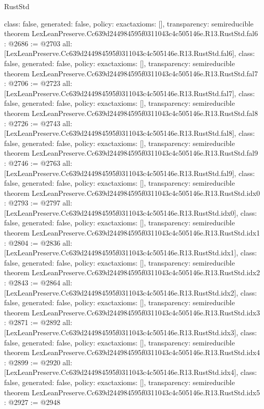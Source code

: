 \begin{lexlean}{RustStd}
\begin{coremodule}
{  class: false,
  generated: false,
  policy: exact{axioms: []},
  transparency: semireducible
}
theorem LexLeanPreserve.Cc639d244984595f0311043c4c505146e.R13.RustStd.fal6 : @2686 := @2703 {
  all: [LexLeanPreserve.Cc639d244984595f0311043c4c505146e.R13.RustStd.fal6],
  class: false,
  generated: false,
  policy: exact{axioms: []},
  transparency: semireducible
}
theorem LexLeanPreserve.Cc639d244984595f0311043c4c505146e.R13.RustStd.fal7 : @2706 := @2723 {
  all: [LexLeanPreserve.Cc639d244984595f0311043c4c505146e.R13.RustStd.fal7],
  class: false,
  generated: false,
  policy: exact{axioms: []},
  transparency: semireducible
}
theorem LexLeanPreserve.Cc639d244984595f0311043c4c505146e.R13.RustStd.fal8 : @2726 := @2743 {
  all: [LexLeanPreserve.Cc639d244984595f0311043c4c505146e.R13.RustStd.fal8],
  class: false,
  generated: false,
  policy: exact{axioms: []},
  transparency: semireducible
}
theorem LexLeanPreserve.Cc639d244984595f0311043c4c505146e.R13.RustStd.fal9 : @2746 := @2763 {
  all: [LexLeanPreserve.Cc639d244984595f0311043c4c505146e.R13.RustStd.fal9],
  class: false,
  generated: false,
  policy: exact{axioms: []},
  transparency: semireducible
}
theorem LexLeanPreserve.Cc639d244984595f0311043c4c505146e.R13.RustStd.idx0 : @2793 := @2797 {
  all: [LexLeanPreserve.Cc639d244984595f0311043c4c505146e.R13.RustStd.idx0],
  class: false,
  generated: false,
  policy: exact{axioms: []},
  transparency: semireducible
}
theorem LexLeanPreserve.Cc639d244984595f0311043c4c505146e.R13.RustStd.idx1 : @2804 := @2836 {
  all: [LexLeanPreserve.Cc639d244984595f0311043c4c505146e.R13.RustStd.idx1],
  class: false,
  generated: false,
  policy: exact{axioms: []},
  transparency: semireducible
}
theorem LexLeanPreserve.Cc639d244984595f0311043c4c505146e.R13.RustStd.idx2 : @2843 := @2864 {
  all: [LexLeanPreserve.Cc639d244984595f0311043c4c505146e.R13.RustStd.idx2],
  class: false,
  generated: false,
  policy: exact{axioms: []},
  transparency: semireducible
}
theorem LexLeanPreserve.Cc639d244984595f0311043c4c505146e.R13.RustStd.idx3 : @2871 := @2892 {
  all: [LexLeanPreserve.Cc639d244984595f0311043c4c505146e.R13.RustStd.idx3],
  class: false,
  generated: false,
  policy: exact{axioms: []},
  transparency: semireducible
}
theorem LexLeanPreserve.Cc639d244984595f0311043c4c505146e.R13.RustStd.idx4 : @2899 := @2920 {
  all: [LexLeanPreserve.Cc639d244984595f0311043c4c505146e.R13.RustStd.idx4],
  class: false,
  generated: false,
  policy: exact{axioms: []},
  transparency: semireducible
}
theorem LexLeanPreserve.Cc639d244984595f0311043c4c505146e.R13.RustStd.idx5 : @2927 := @2948 {
}
\end{coremodule}
\end{lexlean}
